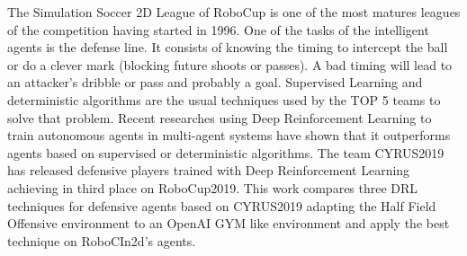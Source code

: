 The Simulation Soccer 2D League of RoboCup is one of the most matures leagues of the competition having started in 1996. One of the tasks of the intelligent agents is the defense line. It consists of knowing the timing to intercept the ball or do a clever mark (blocking future shoots or passes). A bad timing will lead to an attacker's dribble or pass and probably a goal. Supervised Learning and deterministic algorithms are the usual techniques used by the TOP 5 teams to solve that problem. Recent researches using Deep Reinforcement Learning to train autonomous agents in multi-agent systems have shown that it outperforms agents based on supervised or deterministic algorithms. The team CYRUS2019 has released defensive players trained with Deep Reinforcement Learning achieving in third place on RoboCup2019. This work compares three DRL techniques for defensive agents based on CYRUS2019 adapting the Half Field Offensive environment to an OpenAI GYM like environment and apply the best technique on RoboCIn2d's agents.